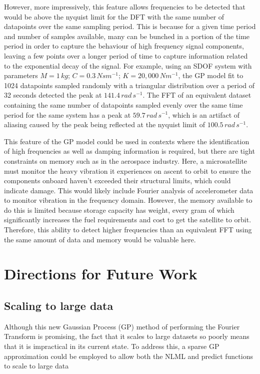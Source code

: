 \documentclass[12pt]{article}
\begin{document}
    However, more impressively, this feature allows frequencies to be detected that would be above the nyquist limit for the DFT with the same number of datapoints over the same sampling period.
    This is because for a given time period and number of samples available, many can be bunched in a portion of the time period in order to capture the behaviour of high frequency signal components, leaving a few points over a longer period of time to capture information related to the exponential decay of the signal.
    For example, using an SDOF system with parameters $M = 1 \, kg$; $C = 0.3 \, Nsm^{-1}$; $K = 20,000 \, Nm^{-1}$, the GP model fit to 1024 datapoints sampled randomly with a triangular distribution over a period of 32 seconds detected the peak at $141.4 \, rad \, s^{-1}$.
    The FFT of an equivalent dataset containing the same number of datapoints sampled evenly over the same time period for the same system has a peak at $59.7 \, rad \, s^{-1}$, which is an artifact of aliasing caused by the peak being reflected at the nyquist limit of $100.5 \, rad \, s^{-1}$.

    This feature of the GP model could be used in contexts where the identification of high frequencies as well as damping information is required, but there are tight constraints on memory such as in the aerospace industry.
    Here, a microsatellite must monitor the heavy vibration it experiences on ascent to orbit to ensure the components onboard haven't exceeded their structural limits, which could indicate damage.
    This would likely include Fourier analysis of accelerometer data to monitor vibration in the frequency domain.
    However, the memory available to do this is limited because storage capacity has weight, every gram of which significantly increases the fuel requirements and cost to get the satellite to orbit.
    Therefore, this ability to detect higher frequencies than an equivalent FFT using the same amount of data and memory would be valuable here.

    \section{Directions for Future Work}

    \subsection{Scaling to large data}
    Although this new Gaussian Process (GP) method of performing the Fourier Transform is promising, the fact that it scales to large datasets so poorly means that it is impractical in its current state.
    To address this, a sparse GP approximation could be employed to allow both the NLML and predict functions to scale to large data
\end{document}
